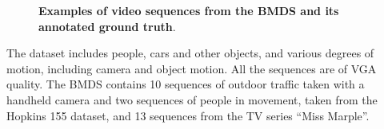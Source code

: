 \begin{figure}[h]
\setcounter{subfigure}{1}

 \caption[Examples of video sequences from the BMDS and its annotated ground truth]{
  {\bf Examples of video sequences from the BMDS and its annotated ground truth}.}
\label{fig:seg_example}
\end{figure}

The dataset includes people, cars and other objects, and various degrees of motion, including camera and object motion. All the sequences are of VGA quality.
The BMDS contains 10 sequences of outdoor traffic taken with a handheld camera and two sequences of people in movement, taken from the Hopkins 155 dataset, and 13 sequences from the TV series ``Miss Marple''. 

